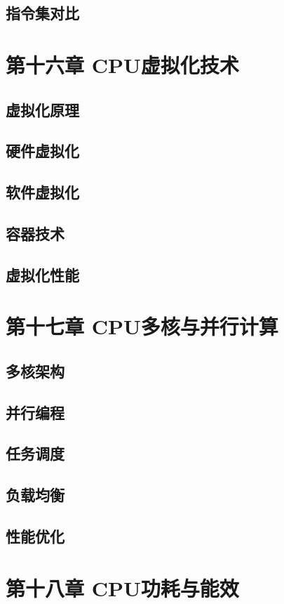 \documentclass[12pt,UTF8]{ctexbook}
\begin{document}
\section{指令集对比}

\chapter{第十六章 CPU虚拟化技术}

\section{虚拟化原理}
\section{硬件虚拟化}
\section{软件虚拟化}
\section{容器技术}
\section{虚拟化性能}

\chapter{第十七章 CPU多核与并行计算}

\section{多核架构}
\section{并行编程}
\section{任务调度}
\section{负载均衡}
\section{性能优化}

\chapter{第十八章 CPU功耗与能效}
\end{document}
